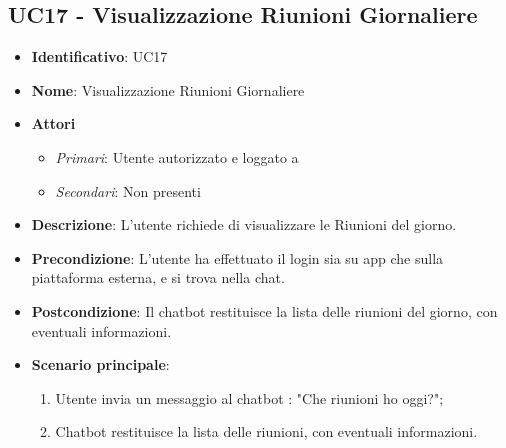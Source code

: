 \subsection{UC17 - Visualizzazione Riunioni Giornaliere }
\begin{itemize}
	\item \textbf{Identificativo}: UC17
	\item \textbf{Nome}: Visualizzazione Riunioni Giornaliere
	\item \textbf{Attori}
	\begin{itemize} 
		\item \textit{Primari}: Utente autorizzato e loggato a 
		\item \textit{Secondari}: Non presenti
	\end{itemize}
	\item \textbf{Descrizione}: L'utente richiede di visualizzare le Riunioni del giorno.
	\item \textbf{Precondizione}: L'utente ha effettuato il login sia su app che sulla piattaforma esterna, e si trova nella chat.
	\item \textbf{Postcondizione}: Il chatbot restituisce la lista delle riunioni del giorno, con eventuali informazioni.
	\item \textbf{Scenario principale}:  \begin{enumerate}
		\item Utente invia un messaggio al chatbot : "Che riunioni ho oggi?";
		\item Chatbot restituisce la lista delle riunioni, con eventuali informazioni.
	\end{enumerate}
\end{itemize}
